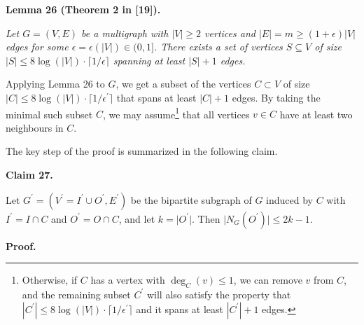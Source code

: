 

\par\medskip\noindent\textbf{
\textbf{Lemma 26}\textbf{ }(Theorem 2 in [19])\textbf{.}
}\par



\emph{Let $G=(V,E)$ be a multigraph with $\lvert V\rvert\geq 2$ vertices and $\lvert E\rvert=m\geq(1+\epsilon)\lvert V\rvert$ edges for some $\epsilon=\epsilon(\lvert V\rvert)\in(0,1]$. There exists a set of vertices $S\subseteq V$ of size $|S|\leq 8\log(\lvert V\rvert)\cdot\lceil 1/\epsilon\rceil$ spanning at least $|S|+1$ edges.}\par






Applying Lemma 26 to $G$, we get a subset of the vertices $C\subset V$ of size $|C|\leq 8\log(\lvert V\rvert)\cdot\lceil 1/\epsilon^{\prime}\rceil$ that spans at least $|C|+1$ edges.
By taking the minimal such subset $C$, we may assume\footnote{Otherwise, if $C$ has a vertex with $\deg_{C}(v)\leq 1$, we can remove $v$ from $C$, and the remaining subset $C^{\prime}$ will also satisfy the property that
$|C^{\prime}|\leq 8\log(\lvert V\rvert)\cdot\lceil 1/\epsilon^{\prime}\rceil$ and it spans at least $|C^{\prime}|+1$ edges.} that all vertices $v\in C$ have at least two neighbours in $C$.\par




The key step of the proof is summarized in the following claim.\par





\par\medskip\noindent\textbf{
Claim 27. 
}\par



Let $G^{\prime}=(V^{\prime}=I^{\prime}\cup O^{\prime},E^{\prime})$ be the bipartite subgraph of $G$ induced by $C$ with $I^{\prime}=I\cap C$ and $O^{\prime}=O\cap C$, and let $k=\lvert O^{\prime}\rvert$. Then $\lvert N_{G}(O^{\prime})\rvert\leq 2k-1$.\par







\par\medskip\noindent\textbf{
\textbf{Proof}.}\par




